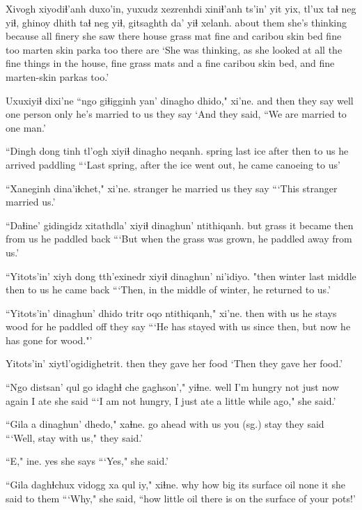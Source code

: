 \documentclass[12pt]{article}
\begin{document}
\gll Xivogh xiyodiɬ'anh duxo'in, yuxudz xezrenhdi xiniɬ'anh ts'in' yit yix, tl'ux taɬ neg yiɬ, ghinoy dhith taɬ neg yiɬ, gitsaghth da' yiɬ xelanh.
{about them} {she's thinking} because all finery {she saw} {} there house grass mat fine and caribou  skin bed fine too {marten skin} parka too {there are}
\glt `She was thinking, as she looked at all the fine things in the house, fine grass mats and a fine caribou skin bed, and fine marten-skin parkas too.'
\glend 

\gll Uxuxiyiɬ dixi'ne ``ngo giɬigginh yan' {dinagho dhido,"} xi'ne.
{and then} {they say} well {one person} only {he's married to us}  {they say}
\glt `And they said, ``We are married to one man.'
\glend 

\gll ``Dingh dong tinh tl'ogh xiyiɬ dinagho neqanh.
spring  last ice after then {to us}  {he arrived paddling}
\glt ```Last spring, after the ice went out, he came canoeing to us'
\glend 

\gll ``Xaneginh dina'iɬchet," xi'ne.
stranger {he married us}  {they say}
\glt ```This stranger married us.'
\glend 

\gll ``Daɬine' gidingidz xitathdla' xiyiɬ dinaghun' ntithiqanh.
but  grass  {it became} then {from us} {he paddled back}
\glt ```But when the grass was grown, he paddled away from us.'
\glend 

\gll ``Yitots'in' xiyh dong tth'exinedr xiyiɬ dinaghun' ni'idiyo.
"then  winter last middle  then {to us}  {he came back}
\glt ```Then, in the middle of winter, he returned to us.'
\glend 

\gll ``Yitots'in' dinaghun' dhido  tritr oqo ntithiqanh," xi'ne.
then  {with us}  {he stays} wood for {he paddled off}  {they say}
\glt ```He has stayed with us since then, but now he has gone for wood."'
\glend 

\gll Yitots'in' xiytl'ogidighetrit.
then  {they gave her food}
\glt `Then they gave her food.'
\glend 

\gll ``Ngo distsan' qul  {go idaghɬ} che gaghson'," yiɬne.
well {I'm hungry} not {just now}  again {I ate} {she said}
\glt ```I am not hungry, I just ate a little while ago," she said.'
\glend 

\gll ``Gila a dinaghun' dhedo," xaɬne.
{go ahead} {} {with us}  {you (sg.) stay}  {they said}
\glt ```Well, stay with us," they said.'
\glend 

\gll ``E," ine.
yes  {she says}
\glt ```Yes," she said.'
\glend 

\gll ``Gila daghɬchux vidogg xa qul iy," xiɬne.
why {how big} {its surface} oil none it  {she said to them}
\glt ```Why," she said, ``how little oil there is on the surface of your pots!'
\glend 
\end{document}
